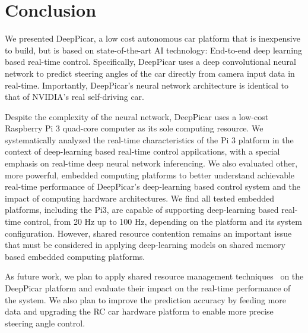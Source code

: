 \section{Conclusion}\label{sec:conclusion}
We presented DeepPicar, a low cost autonomous car platform that is
inexpensive to build, but is based on state-of-the-art AI technology:
End-to-end deep learning based real-time control.
Specifically, DeepPicar uses a deep convolutional neural network to
predict steering angles of the car directly from camera input data
in real-time. Importantly, DeepPicar's neural network architecture is
identical to that of NVIDIA's real self-driving car. 

Despite the complexity of the neural network, DeepPicar uses a
low-cost Raspberry Pi 3 quad-core computer as its sole computing
resource. We systematically analyzed the real-time characteristics of
the Pi 3 platform in the context of deep-learning based real-time
control appilcations, with a special emphasis on real-time deep neural
network inferencing.
We also evaluated other, more powerful, embedded computing
platforms to better understand achievable real-time performance of
DeepPicar's deep-learning based control system and the impact of
computing hardware architectures.
We find all tested embedded platforms, including the Pi3, are capable
of supporting deep-learning based real-time control, from 20 Hz up to
100 Hz, depending on the platform and its system
configuration. However, shared resource contention remains an
important issue that must be considered in applying deep-learning
models on shared memory based embedded computing platforms.

As future work, we plan to apply shared resource management
techniques~\cite{Yun2013,yun2014rtas} on the DeepPicar platform and
evaluate their impact on the real-time performance of the system. We
also plan to improve the prediction accuracy by feeding more data and
upgrading the RC car hardware platform to enable more precise steering
angle control.